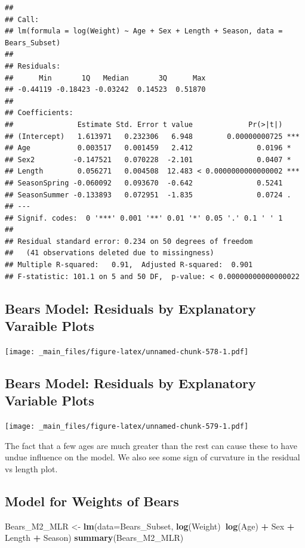 \documentclass[]{book}
\newenvironment{Shaded}{\begin{snugshade}}{\end{snugshade}}
\newcommand{\KeywordTok}[1]{\textcolor[rgb]{0.13,0.29,0.53}{\textbf{#1}}}
\newcommand{\DataTypeTok}[1]{\textcolor[rgb]{0.13,0.29,0.53}{#1}}
\newcommand{\StringTok}[1]{\textcolor[rgb]{0.31,0.60,0.02}{#1}}
\newcommand{\OperatorTok}[1]{\textcolor[rgb]{0.81,0.36,0.00}{\textbf{#1}}}
\newcommand{\NormalTok}[1]{#1}
\begin{document}
\begin{verbatim}
## 
## Call:
## lm(formula = log(Weight) ~ Age + Sex + Length + Season, data = Bears_Subset)
## 
## Residuals:
##      Min       1Q   Median       3Q      Max 
## -0.44119 -0.18423 -0.03242  0.14523  0.51870 
## 
## Coefficients:
##               Estimate Std. Error t value             Pr(>|t|)    
## (Intercept)   1.613971   0.232306   6.948        0.00000000725 ***
## Age           0.003517   0.001459   2.412               0.0196 *  
## Sex2         -0.147521   0.070228  -2.101               0.0407 *  
## Length        0.056271   0.004508  12.483 < 0.0000000000000002 ***
## SeasonSpring -0.060092   0.093670  -0.642               0.5241    
## SeasonSummer -0.133893   0.072951  -1.835               0.0724 .  
## ---
## Signif. codes:  0 '***' 0.001 '**' 0.01 '*' 0.05 '.' 0.1 ' ' 1
## 
## Residual standard error: 0.234 on 50 degrees of freedom
##   (41 observations deleted due to missingness)
## Multiple R-squared:   0.91,  Adjusted R-squared:  0.901 
## F-statistic: 101.1 on 5 and 50 DF,  p-value: < 0.00000000000000022
\end{verbatim}

\subsection{Bears Model: Residuals by Explanatory Varaible
Plots}\label{bears-model-residuals-by-explanatory-varaible-plots}

\texttt{[image: \_main\_files/figure-latex/unnamed-chunk-578-1.pdf]}

\subsection{Bears Model: Residuals by Explanatory Variable
Plots}\label{bears-model-residuals-by-explanatory-variable-plots}

\texttt{[image: \_main\_files/figure-latex/unnamed-chunk-579-1.pdf]}

The fact that a few ages are much greater than the rest can cause these
to have undue influence on the model. We also see some sign of curvature
in the residual vs length plot.

\subsection{Model for Weights of
Bears}\label{model-for-weights-of-bears-1}

\begin{Shaded}
\begin{Highlighting}[]
\NormalTok{Bears_M2_MLR <-}\StringTok{ }\KeywordTok{lm}\NormalTok{(}\DataTypeTok{data=}\NormalTok{Bears_Subset, }\KeywordTok{log}\NormalTok{(Weight)}\OperatorTok{~}\KeywordTok{log}\NormalTok{(Age) }\OperatorTok{+}\StringTok{ }\NormalTok{Sex }\OperatorTok{+}\StringTok{ }\NormalTok{Length }\OperatorTok{+}\StringTok{ }\NormalTok{Season)}
\KeywordTok{summary}\NormalTok{(Bears_M2_MLR)}
\end{Highlighting}
\end{Shaded}
\end{document}
